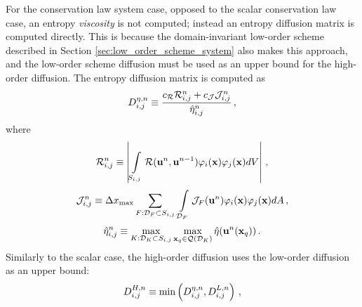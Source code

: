 For the conservation law system case, opposed to the scalar conservation
law case, an entropy \emph{viscosity} is not computed; instead an entropy diffusion
matrix is computed directly. This is because the domain-invariant low-order scheme
described in Section \ref{sec:low_order_scheme_system} also makes
this approach, and the low-order scheme diffusion must be used as an upper bound
for the high-order diffusion. The entropy diffusion matrix is computed as
\begin{equation}
  D^{\eta,n}_{i,j} \equiv
    \frac{c_{\mathcal{R}}\mathcal{R}_{i,j}^n +
      c_{\mathcal{J}}\mathcal{J}_{i,j}^n}
      {\hat{\eta}^n_{i,j}}
  \,,
\end{equation}
where
\begin{equation}
  \mathcal{R}_{i,j}^n \equiv \left|
    \int\limits_{S_{i,j}}
      \mathcal{R}(\mathbf{u}^n,\mathbf{u}^{n-1})
      \varphi_i(\mathbf{x})
      \varphi_j(\mathbf{x}) dV
    \right|
  \,,
\end{equation}
\begin{equation}
  \mathcal{J}_{i,j}^n \equiv \Delta x_{\text{max}}
    \sum\limits_{F:\mathcal{D}_F\subset S_{i,j}} \,
    \int\limits_{\mathcal{D}_F}\mathcal{J}_F(\mathbf{u}^n)
      \varphi_i(\mathbf{x})
      \varphi_j(\mathbf{x}) dA
  \,,
\end{equation}
\begin{equation}
  \hat{\eta}^n_{i,j} \equiv
    \max\limits_{K:\mathcal{D}_K\subset S_{i,j}}
    \max\limits_{\mathbf{x}_q\in\mathcal{Q}(\mathcal{D}_K)}
    \hat{\eta}(\mathbf{u}^n(\mathbf{x}_q))
  \,.
\end{equation}
Similarly to the scalar case, the high-order diffusion uses the low-order
diffusion as an upper bound:
\begin{equation}
  D^{H,n}_{i,j} \equiv
    \min\left(D^{\eta,n}_{i,j},
      D^{L,n}_{i,j}\right)
  \,,
\end{equation}

